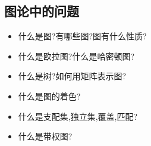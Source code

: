 {{  \subsection{图论中的问题}{
    \begin{itemize}
      \item 什么是图?有哪些图?图有什么性质?
      \item 什么是欧拉图?什么是哈密顿图?
      \item 什么是树?如何用矩阵表示图?
      \item 什么是图的着色?
      \item 什么是支配集,独立集,覆盖,匹配?
      \item 什么是带权图?
    \end{itemize}
  }%

 }%

}%